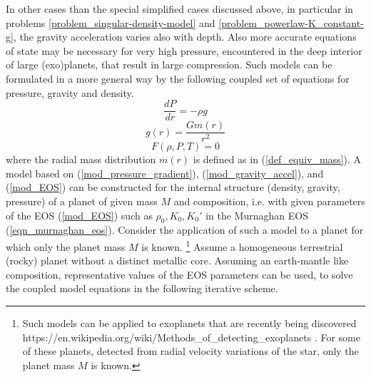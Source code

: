 In other cases than the special simplified cases discussed above, 
in particular in problems \ref{problem_singular-density-model} and 
\ref{problem_powerlaw-K_constant-g},
the gravity acceleration varies also with depth.
Also more accurate equations of state may be necessary for very high pressure,
encountered in the deep interior of large (exo)planets,
that result in large compression.
Such models can be formulated in a more general way by the following coupled set
of equations for pressure, gravity and density.
\begin{equation}
  \frac{dP}{dr} = - \rho g
\label{mod_pressure_gradient}
\end{equation}
\begin{equation}
  g(r) = \frac{G m(r)}{r^2} 
\label{mod_gravity_accel}
\end{equation}
\begin{equation}
  F(\rho,P,T) = 0
\label{mod_EOS}
\end{equation}
where the radial mass distribution $m(r)$ is defined as in (\ref{def_equiv_mass}).
A model based on 
(\ref{mod_pressure_gradient}),
(\ref{mod_gravity_accel}), and 
(\ref{mod_EOS}) 
can be constructed for the internal structure 
(density, gravity, pressure) of a planet of given mass $M$ and composition,
i.e. with given parameters of the EOS (\ref{mod_EOS}) such as 
$\rho_0, K_0, K_0'$ in the Murnaghan EOS (\ref{eqn_murnaghan_eos}). 
Consider the application of such a model to a planet for which only the 
planet mass $M$ is known.
\footnote{
Such models can be applied to exoplanets that are recently being discovered
https://en.wikipedia.org/wiki/Methods\_of\_detecting\_exoplanets .
For some of these planets, detected from radial velocity variations of the star,
only the planet mass $M$ is known.
}
Assume a homogeneous terrestrial (rocky) planet without a distinct metallic core. 
Assuming an earth-mantle like composition, representative values of the
EOS parameters can be used, to solve the coupled model equations in 
the following iterative scheme.
